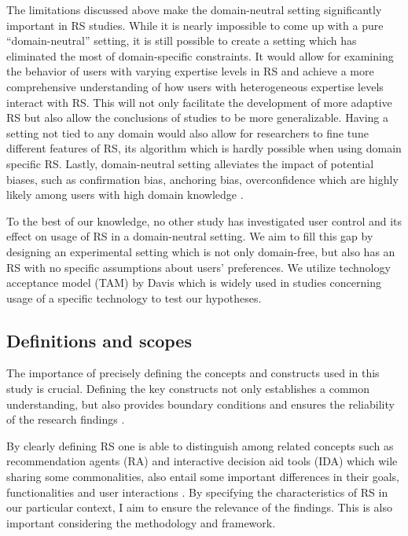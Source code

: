 \documentclass[a4paper,12pt]{article}
\begin{document}
The limitations discussed above make the domain-neutral setting significantly important in RS studies. While it is nearly impossible to come up with a pure ``domain-neutral'' setting, it is still possible to create a setting which has eliminated the most of domain-specific constraints. It would allow for examining the behavior of users with varying expertise levels in RS and achieve a more comprehensive understanding of how users with heterogeneous expertise levels interact with RS. This will not only facilitate the development of more adaptive RS but also allow the conclusions of studies to be more generalizable. Having a setting not tied to any domain would also allow for researchers to fine tune different features of RS, its algorithm which is hardly possible when using domain specific RS. Lastly, domain-neutral setting alleviates the impact of potential biases, such as confirmation bias, anchoring bias, overconfidence which are highly likely among users with high domain knowledge \citep{hijikata2012relation}.

To the best of our knowledge, no other study has investigated user control and its effect on usage of RS in a domain-neutral setting. We aim to fill this gap by designing an experimental setting which is not only domain-free, but also has an RS with no specific assumptions about users' preferences. We utilize technology acceptance model (TAM) by Davis which is widely used in studies concerning usage of a specific technology \citep{davis1985technology} to test our hypotheses.

\subsection{Definitions and scopes}

The importance of precisely defining the concepts and constructs used in this study is crucial. Defining the key constructs not only establishes a common understanding, but also provides boundary conditions and ensures the reliability of the research findings \citep{creswell2013research}.

By clearly defining RS one is able to distinguish among related concepts such as recommendation agents (RA) and interactive decision aid tools (IDA) which wile sharing some commonalities, also entail some important differences in their goals, functionalities and user interactions \citep{xiao2007commerce}. By specifying the characteristics of RS in our particular context, I aim to ensure the relevance of the findings. This is also important considering the methodology and framework.
\end{document}

